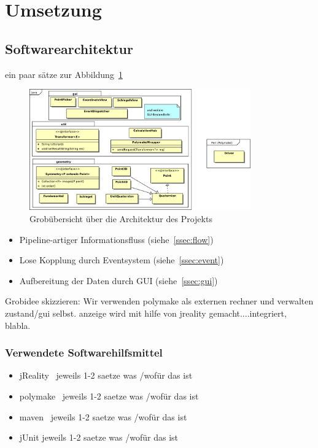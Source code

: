 \section{Umsetzung}
\subsection{Softwarearchitektur}
     ein paar sätze zur Abbildung~\ref{fig:architecture}
     \begin{figure}[tbh]
            \centering
            \includegraphics[width=0.85\textwidth]{img/architecture}
            \caption{Grobübersicht über die Architektur des Projekts\label{fig:architecture}}
        \end{figure}
    \begin{itemize}
        \item Pipeline-artiger Informationsfluss (siehe~\ref{ssec:flow})
        \item Lose Kopplung durch Eventsystem (siehe~\ref{ssec:event})
        \item Aufbereitung der Daten durch GUI (siehe~\ref{ssec:gui})
    \end{itemize}
    Grobidee skizzieren: Wir verwenden polymake als externen rechner und verwalten zustand/gui selbst. anzeige wird mit hilfe von jreality gemacht....integriert, blabla.

    \subsubsection{Verwendete Softwarehilfsmittel}
       \begin{itemize}
           \item jReality~\cite{jreality} jeweils 1-2 saetze was /wofür das ist
           \item polymake~\cite{polymake} jeweils 1-2 saetze was /wofür das ist
           \item maven~\cite{maven} jeweils 1-2 saetze was /wofür das ist
           \item jUnit jeweils 1-2 saetze was /wofür das ist
        \end{itemize}

